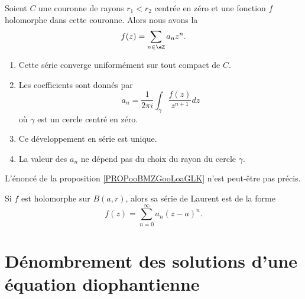 \begin{theorem}       \label{THOooMKJOooVghZyG}
    Soient \( C\) une couronne de rayons \( r_1<r_2\) centrée en zéro et une fonction \( f\) holomorphe dans cette couronne. Alors nous avons la 
    \begin{equation}
        f(z)=\sum_{n\in \eZ}a_nz^n.
    \end{equation}
    \begin{enumerate}
        \item
            Cette série converge uniformément sur tout compact de \( C\).
        \item
            Les coefficients sont donnés par
            \begin{equation}
                a_n=\frac{1}{ 2\pi i }\int_{\gamma}\frac{ f(z) }{ z^{n+1} }dz
            \end{equation}
            où \( \gamma\) est un cercle centré en zéro.
        \item
            Ce développement en série est unique.
        \item
            La valeur des \( a_n\) ne dépend pas du choix du rayon du cercle \( \gamma\).
    \end{enumerate}
\end{theorem}

\begin{probleme}
    L'énoncé de la proposition \ref{PROPooBMZGooLoaGLK} n'est peut-être pas précis.
\end{probleme}

\begin{proposition}     \label{PROPooBMZGooLoaGLK}
    Si \( f\) est holomorphe sur \( B(a,r)\), alors sa série de Laurent est de la forme
    \begin{equation}
        f(z)=\sum_{n=0}^{\infty}a_n(z-a)^n.
    \end{equation}
\end{proposition}


\section{Dénombrement des solutions d'une équation diophantienne}

